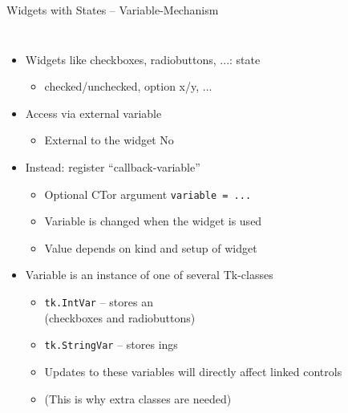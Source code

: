 \begin{frame}[fragile]{Widgets with States -- Variable-Mechanism}
%
\vspace{-6pt}
\begin{columns}[T]
\begin{itemize}
\item Widgets like checkboxes, radiobuttons, ...: state
	\begin{itemize}
	\item checked/unchecked, option x/y, ...
	\end{itemize}
\item Access via external variable 
	\begin{itemize}
	\item External to the widget \Thus No 
	\end{itemize}
\item Instead: register \enquote{callback-variable}
	\begin{itemize}
	\item Optional CTor argument \texttt{variable = ...}
	\item Variable is changed when the widget is used
	\item Value depends on kind and setup of widget
	\end{itemize}
\item Variable is an instance of one of several Tk-classes
	\begin{itemize}
	\item \texttt{tk.IntVar} -- stores an  \\
		(\thus checkboxes and radiobuttons)
	\item \texttt{tk.StringVar} -- stores ings
	\item Updates to these variables will directly affect linked controls
	\item (This is why extra classes are needed)
	\end{itemize}
\end{itemize}
%

\end{columns}
\end{frame}
